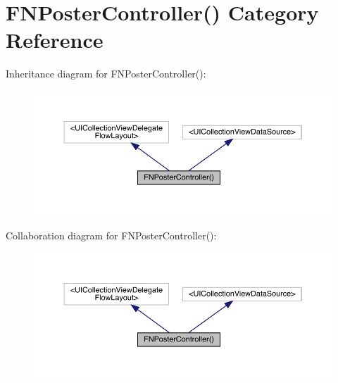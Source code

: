 \hypertarget{category_f_n_poster_controller_07_08}{}\section{F\+N\+Poster\+Controller() Category Reference}
\label{category_f_n_poster_controller_07_08}


Inheritance diagram for F\+N\+Poster\+Controller()\+:\nopagebreak
\begin{figure}[H]
\begin{center}
\leavevmode
\includegraphics[width=350pt]{category_f_n_poster_controller_07_08__inherit__graph}
\end{center}
\end{figure}


Collaboration diagram for F\+N\+Poster\+Controller()\+:\nopagebreak
\begin{figure}[H]
\begin{center}
\leavevmode
\includegraphics[width=350pt]{category_f_n_poster_controller_07_08__coll__graph}
\end{center}
\end{figure}
